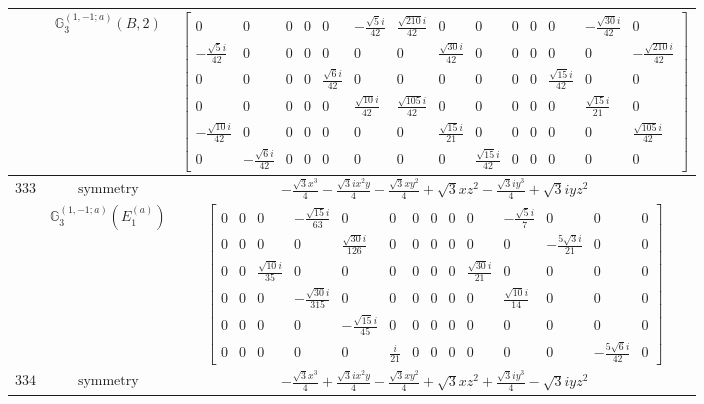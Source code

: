 \documentclass[fleqn,8pt,landscape]{jsarticle}
\begin{document}
\begin{longtable}{ccc}
$  $ & $ \mathbb{G}_{3}^{(1,-1;a)}(B,2) $ & $ \begin{bmatrix} 0 & 0 & 0 & 0 & 0 & - \frac{\sqrt{5} i}{42} & \frac{\sqrt{210} i}{42} & 0 & 0 & 0 & 0 & 0 & - \frac{\sqrt{30} i}{42} & 0 \\ - \frac{\sqrt{5} i}{42} & 0 & 0 & 0 & 0 & 0 & 0 & \frac{\sqrt{30} i}{42} & 0 & 0 & 0 & 0 & 0 & - \frac{\sqrt{210} i}{42} \\ 0 & 0 & 0 & 0 & \frac{\sqrt{6} i}{42} & 0 & 0 & 0 & 0 & 0 & 0 & \frac{\sqrt{15} i}{42} & 0 & 0 \\ 0 & 0 & 0 & 0 & 0 & \frac{\sqrt{10} i}{42} & \frac{\sqrt{105} i}{42} & 0 & 0 & 0 & 0 & 0 & \frac{\sqrt{15} i}{21} & 0 \\ - \frac{\sqrt{10} i}{42} & 0 & 0 & 0 & 0 & 0 & 0 & \frac{\sqrt{15} i}{21} & 0 & 0 & 0 & 0 & 0 & \frac{\sqrt{105} i}{42} \\ 0 & - \frac{\sqrt{6} i}{42} & 0 & 0 & 0 & 0 & 0 & 0 & \frac{\sqrt{15} i}{42} & 0 & 0 & 0 & 0 & 0 \end{bmatrix} $ \\ \hline
$ 333 $ & $ \text{symmetry} $ & $ - \frac{\sqrt{3} x^{3}}{4} - \frac{\sqrt{3} i x^{2} y}{4} - \frac{\sqrt{3} x y^{2}}{4} + \sqrt{3} x z^{2} - \frac{\sqrt{3} i y^{3}}{4} + \sqrt{3} i y z^{2} $ \\
$  $ & $ \mathbb{G}_{3}^{(1,-1;a)}(E_{1}^{(a)}) $ & $ \begin{bmatrix} 0 & 0 & 0 & - \frac{\sqrt{15} i}{63} & 0 & 0 & 0 & 0 & 0 & 0 & - \frac{\sqrt{5} i}{7} & 0 & 0 & 0 \\ 0 & 0 & 0 & 0 & \frac{\sqrt{30} i}{126} & 0 & 0 & 0 & 0 & 0 & 0 & - \frac{5 \sqrt{3} i}{21} & 0 & 0 \\ 0 & 0 & \frac{\sqrt{10} i}{35} & 0 & 0 & 0 & 0 & 0 & 0 & \frac{\sqrt{30} i}{21} & 0 & 0 & 0 & 0 \\ 0 & 0 & 0 & - \frac{\sqrt{30} i}{315} & 0 & 0 & 0 & 0 & 0 & 0 & \frac{\sqrt{10} i}{14} & 0 & 0 & 0 \\ 0 & 0 & 0 & 0 & - \frac{\sqrt{15} i}{45} & 0 & 0 & 0 & 0 & 0 & 0 & 0 & 0 & 0 \\ 0 & 0 & 0 & 0 & 0 & \frac{i}{21} & 0 & 0 & 0 & 0 & 0 & 0 & - \frac{5 \sqrt{6} i}{42} & 0 \end{bmatrix} $ \\ \hline
$ 334 $ & $ \text{symmetry} $ & $ - \frac{\sqrt{3} x^{3}}{4} + \frac{\sqrt{3} i x^{2} y}{4} - \frac{\sqrt{3} x y^{2}}{4} + \sqrt{3} x z^{2} + \frac{\sqrt{3} i y^{3}}{4} - \sqrt{3} i y z^{2} $ \\

\end{longtable}
\end{document}
